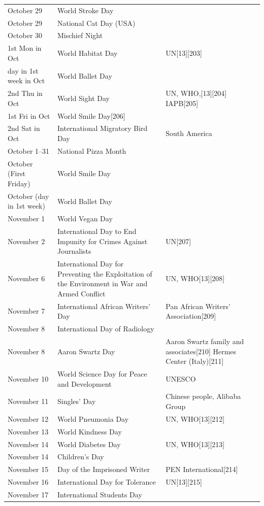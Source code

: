 \documentclass[
]{book}
\begin{document}
\begin{longtable}[t]{>{\raggedright\arraybackslash}p{8em}>{\raggedright\arraybackslash}p{20em}>{\raggedright\arraybackslash}p{12em}}
October 29 & World Stroke Day & \\
\addlinespace
October 29 & National Cat Day (USA) & \\
October 30 & Mischief Night & \\
1st Mon in Oct & World Habitat Day & UN[13][203]\\
day in 1st week in Oct & World Ballet Day & \\
2nd Thu in Oct & World Sight Day & UN, WHO,[13][204] IAPB[205]\\
\addlinespace
1st Fri in Oct & World Smile Day[206] & \\
2nd Sat in Oct & International Migratory Bird Day & South America\\
October 1–31 & National Pizza Month & \\
October (First Friday) & World Smile Day & \\
October (day in 1st week) & World Ballet Day & \\
\addlinespace
November 1 & World Vegan Day & \\
November 2 & International Day to End Impunity for Crimes Against Journalists & UN[207]\\
November 6 & International Day for Preventing the Exploitation of the Environment in War and Armed Conflict & UN, WHO[13][208]\\
November 7 & International African Writers' Day & Pan African Writers' Association[209]\\
November 8 & International Day of Radiology & \\
\addlinespace
November 8 & Aaron Swartz Day & Aaron Swartz family and associates[210] Hermes Center (Italy)[211]\\
November 10 & World Science Day for Peace and Development & UNESCO\\
November 11 & Singles' Day & Chinese people, Alibaba Group\\
November 12 & World Pneumonia Day & UN, WHO[13][212]\\
November 13 & World Kindness Day & \\
\addlinespace
November 14 & World Diabetes Day & UN, WHO[13][213]\\
November 14 & Children's Day & \\
November 15 & Day of the Imprisoned Writer & PEN International[214]\\
November 16 & International Day for Tolerance & UN[13][215]\\
November 17 & International Students Day & \\

\end{longtable}
\end{document}
